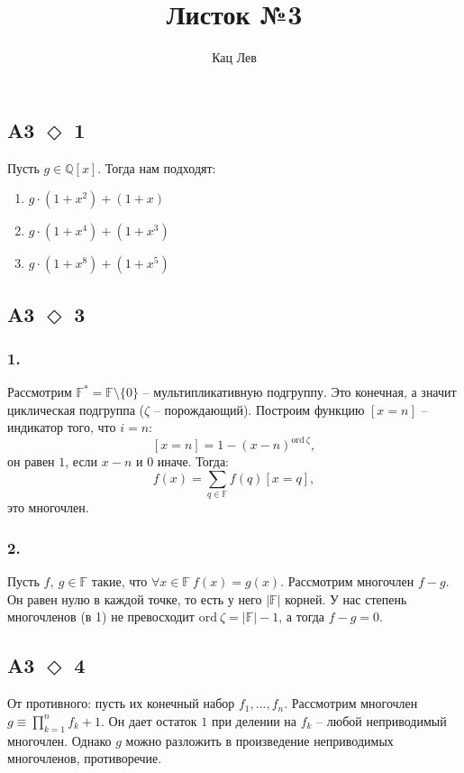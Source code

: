 \documentclass[a4paper]{article}
\title{Листок №3}
\author{Кац Лев}
\newcommand{\task}[2]{A#1 $\Diamond$ #2}
\begin{document}
  \maketitle

  \subsection*{\task{3}{1}}
  Пусть $g \in \mathbb{Q}\left[x\right]$.
  Тогда нам подходят:
  \begin{enumerate}
      \item $g \cdot (1 + x^2) + (1 + x)$
      \item $g \cdot (1 + x^4) + (1 + x^3)$
      \item $g \cdot (1 + x^8) + (1 + x^5)$
  \end{enumerate}

  \subsection*{\task{3}{3}}
  \subsubsection*{1.}
  Рассмотрим $\mathbb{F}^* = \mathbb{F} \setminus \{0\}$ -- мультипликативную подгруппу. Это конечная, а значит циклическая подгруппа ($\zeta$ -- порождающий).
  Построим функцию $\left[x=n\right]$ -- индикатор того, что $i = n$:
  $$\left[x=n\right] = 1 - (x - n)^{\mathrm{ord}\: \zeta},$$
  он равен $1$, если $x - n$ и $0$ иначе. Тогда:
  $$f(x) = \sum_{q \in \mathbb{F}} f(q)\left[x=q\right],$$
  это многочлен.
  \subsubsection*{2.}
  Пусть $f,\:g \in \mathbb{F}$ такие, что $\forall x \in \mathbb{F}\:f(x)=g(x)$. Рассмотрим многочлен $f - g$. Он равен нулю в каждой точке, то есть у него $|\mathbb{F}|$ корней. У нас степень многочленов (в 1) не превосходит $\mathrm{ord}\: \zeta = |\mathbb{F}| - 1$, а тогда $f - g = 0$.

  \subsection*{\task{3}{4}}
  От противного: пусть их конечный набор $f_1, ..., f_n$. Рассмотрим многочлен $g \equiv \prod_{k=1}^n f_k + 1$. Он дает остаток $1$ при делении на $f_k$ -- любой неприводимый многочлен. Однако $g$ можно разложить в произведение неприводимых многочленов, противоречие.
\end{document}
